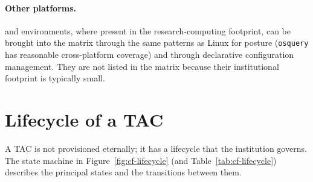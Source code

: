 \paragraph{Other platforms.}  and
 environments, where present in the
research-computing footprint, can be brought into the matrix
through the same patterns as Linux for posture
(\texttt{osquery} has reasonable cross-platform coverage) and
through declarative configuration management. They are not
listed in the matrix because their institutional footprint is
typically small.

\section{Lifecycle of a TAC}
\label{sec:cf-lifecycle}

A TAC is not provisioned eternally; it has a lifecycle that the
institution governs. The state machine in
Figure~\ref{fig:cf-lifecycle} (and Table~\ref{tab:cf-lifecycle})
describes the principal states and the transitions between them.

